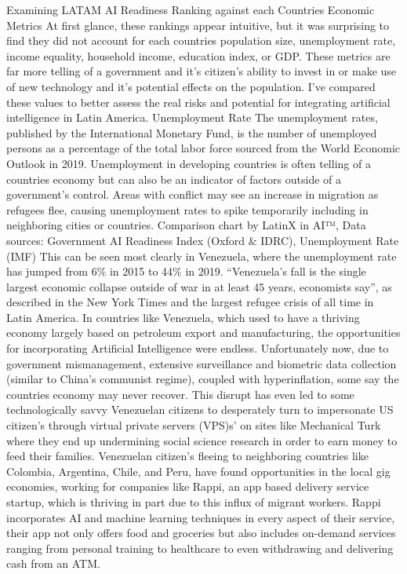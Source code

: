\documentclass[conference]{IEEEtran}
\begin{document}
Examining LATAM AI Readiness Ranking against each Countries Economic Metrics
At first glance, these rankings appear intuitive, but it was surprising to find they did not account for each countries population size, unemployment rate, income equality, household income, education index, or GDP. These metrics are far more telling of a government and it's citizen's ability to invest in or make use of new technology and it's potential effects on the population. I've compared these values to better assess the real risks and potential for integrating artificial intelligence in Latin America.
Unemployment Rate
The unemployment rates, published by the International Monetary Fund, is the number of unemployed persons as a percentage of the total labor force sourced from the World Economic Outlook in 2019. Unemployment in developing countries is often telling of a countries economy but can also be an indicator of factors outside of a government's control. Areas with conflict may see an increase in migration as refugees flee, causing unemployment rates to spike temporarily including in neighboring cities or countries.
Comparison chart by LatinX in AI™, Data sources: Government AI Readiness Index (Oxford \& IDRC), Unemployment Rate (IMF)
This can be seen most clearly in Venezuela, where the unemployment rate has jumped from 6\% in 2015 to 44\% in 2019. ``Venezuela's fall is the single largest economic collapse outside of war in at least 45 years, economists say'', as described in the New York Times and the largest refugee crisis of all time in Latin America. In countries like Venezuela, which used to have a thriving economy largely based on petroleum export and manufacturing, the opportunities for incorporating Artificial Intelligence were endless. Unfortunately now, due to government mismanagement, extensive surveillance and biometric data collection (similar to China's communist regime), coupled with hyperinflation, some say the countries economy may never recover.
This disrupt has even led to some technologically savvy Venezuelan citizens to desperately turn to impersonate US citizen's through virtual private servers (VPS)s' on sites like Mechanical Turk where they end up undermining social science research in order to earn money to feed their families. Venezuelan citizen's fleeing to neighboring countries like Colombia, Argentina, Chile, and Peru, have found opportunities in the local gig economies, working for companies like Rappi, an app based delivery service startup, which is thriving in part due to this influx of migrant workers. Rappi incorporates AI and machine learning techniques in every aspect of their service, their app not only offers food and groceries but also includes on-demand services ranging from personal training to healthcare to even withdrawing and delivering cash from an ATM.
\end{document}
